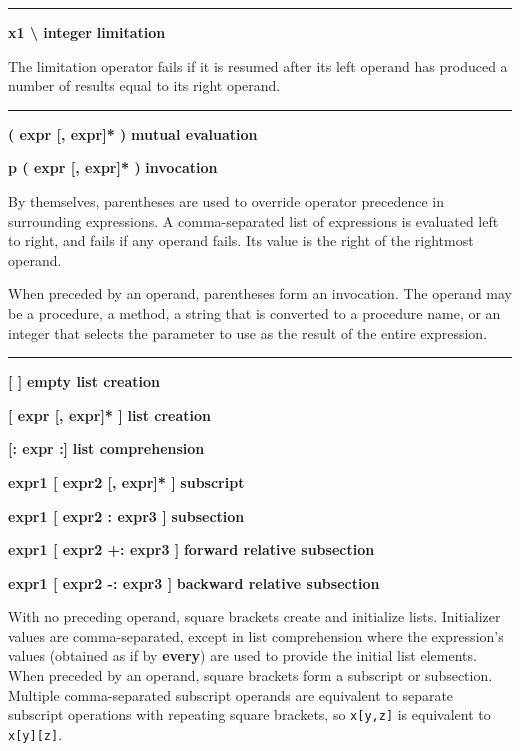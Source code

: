 \bigskip\hrule\vspace{0.1cm}
\noindent
{\bf x1 {\textbackslash} integer } \hfill {\bf limitation}

\noindent
The limitation operator fails if it
is resumed after its left operand has produced a number of results
equal to its right operand.

\bigskip\hrule\vspace{0.1cm}
\noindent
{\bf ( expr [, expr]* ) } \hfill {\bf mutual evaluation}

\noindent
{\bf p ( expr [, expr]* ) } \hfill {\bf invocation}

\noindent
By themselves, parentheses are used
to override operator precedence in surrounding expressions. A
comma-separated list of expressions is evaluated left to right, and
fails if any operand fails. Its value is the right of the rightmost
operand.

When preceded by an operand, parentheses form an
invocation. The operand may be a procedure,
a method, a string that is converted to a procedure name, or an integer
that selects the parameter to use as the result of the entire expression.

\bigskip\hrule\vspace{0.1cm}

\noindent
{\bf \textbf{[} \textbf{]} } \hfill {\bf empty list creation}

\noindent
{\bf \textbf{[} expr [, expr]* \textbf{]} } \hfill {\bf list creation}

\noindent
{\bf \textbf{[:} expr \textbf{:]} } \hfill {\bf list comprehension}

\noindent
{\bf expr1 \textbf{[} expr2 [, expr]* \textbf{]} } \hfill {\bf subscript}

\noindent
{\bf expr1 \textbf{[} expr2 : expr3 \textbf{]} } \hfill {\bf subsection}\WarningNotThreadSafe
{}

\noindent
{\bf expr1 \textbf{[} expr2 +: expr3 \textbf{]} } \hfill {\bf forward relative subsection}

\noindent
{\bf expr1 \textbf{[} expr2 -: expr3 \textbf{]} } \hfill {\bf backward relative subsection}

\noindent
With no preceding operand, square brackets create and initialize lists.
Initializer values are comma-separated, except in list comprehension
where the expression's values (obtained as if by \textbf{every}) are used
to provide the initial list elements.
When preceded by an operand, square brackets form a subscript or
subsection. Multiple comma-separated subscript operands are equivalent
to separate subscript operations with repeating square brackets, so
\texttt{x[y,z]} is equivalent to \texttt{x[y][z]}.

